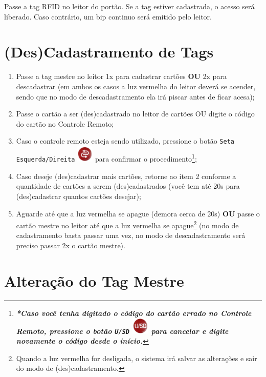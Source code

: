 \documentclass[a4paper, 12pt]{article}
\begin{document}
Passe a tag RFID no leitor do portão. Se a tag estiver cadastrada, o acesso será liberado. Caso contrário, um bip continuo será emitido pelo leitor.

\section{(Des)Cadastramento de Tags}

\newcommand{\alertaControleRemoto}{\textbf{\textit{*Caso você tenha digitado o código do cartão errado no Controle Remoto, pressione o botão \texttt{U/SD} \includegraphics[height=8mm]{cancel} para cancelar e digite novamente o código desde o início.}}}

\newcommand{\avisoLuzVermelha}{Quando a luz vermelha for desligada, o sistema irá salvar as alterações e sair do modo de (des)cadastramento.}

\begin{enumerate}
\item Passe a tag mestre no leitor 1x para cadastrar cartões \textbf{OU} 2x para descadastrar (em ambos os casos a luz vermelha do leitor deverá se acender, sendo que no modo de descadastramento ela irá piscar antes de ficar acesa);
\item Passe o cartão a ser (des)cadastrado no leitor de cartões OU digite o código do cartão no Controle Remoto;
\item Caso o controle remoto esteja sendo utilizado, pressione o botão \texttt{Seta Esquerda/Direita} \includegraphics[height=8mm]{ok} para confirmar o procedimento\footnote{\alertaControleRemoto};
\item Caso deseje (des)cadastrar mais cartões, retorne ao item 2 conforme a quantidade de cartões a serem (des)cadastrados (você tem até 20s para (des)cadastrar quantos cartões desejar);
\item Aguarde até que a luz vermelha se apague (demora cerca de 20s) \textbf{OU} passe o cartão mestre no leitor até que a luz vermelha se apague\footnote{\avisoLuzVermelha} (no modo de cadastramento basta passar uma vez, no modo de descadastramento será preciso passar 2x o cartão mestre).
\end{enumerate}

\newpage
\section{Alteração do Tag Mestre}
\end{document}
